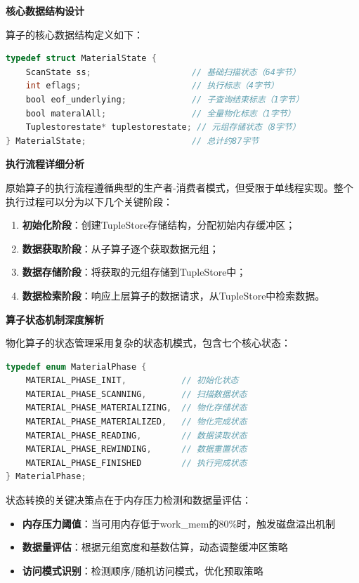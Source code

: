 \textbf{核心数据结构设计}

算子的核心数据结构定义如下：

\begin{lstlisting}[language=C, caption=原始MaterialState结构定义]
typedef struct MaterialState {
    ScanState ss;                    // 基础扫描状态（64字节）
    int eflags;                      // 执行标志（4字节）
    bool eof_underlying;             // 子查询结束标志（1字节）
    bool materalAll;                 // 全量物化标志（1字节）
    Tuplestorestate* tuplestorestate; // 元组存储状态（8字节）
} MaterialState;                     // 总计约87字节
\end{lstlisting}

\textbf{执行流程详细分析}

原始算子的执行流程遵循典型的生产者-消费者模式，但受限于单线程实现。整个执行过程可以分为以下几个关键阶段：

\begin{enumerate}
    \item \textbf{初始化阶段}：创建TupleStore存储结构，分配初始内存缓冲区；
    \item \textbf{数据获取阶段}：从子算子逐个获取数据元组；
    \item \textbf{数据存储阶段}：将获取的元组存储到TupleStore中；
    \item \textbf{数据检索阶段}：响应上层算子的数据请求，从TupleStore中检索数据。
\end{enumerate}

\textbf{算子状态机制深度解析}

物化算子的状态管理采用复杂的状态机模式，包含七个核心状态：

\begin{lstlisting}[language=C, caption=物化算子状态机定义]
typedef enum MaterialPhase {
    MATERIAL_PHASE_INIT,           // 初始化状态
    MATERIAL_PHASE_SCANNING,       // 扫描数据状态
    MATERIAL_PHASE_MATERIALIZING,  // 物化存储状态
    MATERIAL_PHASE_MATERIALIZED,   // 物化完成状态
    MATERIAL_PHASE_READING,        // 数据读取状态
    MATERIAL_PHASE_REWINDING,      // 数据重置状态
    MATERIAL_PHASE_FINISHED        // 执行完成状态
} MaterialPhase;
\end{lstlisting}

状态转换的关键决策点在于内存压力检测和数据量评估：

\begin{itemize}
    \item \textbf{内存压力阈值}：当可用内存低于work\_mem的80\%时，触发磁盘溢出机制
    \item \textbf{数据量评估}：根据元组宽度和基数估算，动态调整缓冲区策略
    \item \textbf{访问模式识别}：检测顺序/随机访问模式，优化预取策略
\end{itemize}

